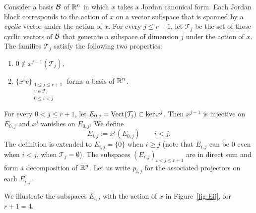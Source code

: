 \documentclass[english]{article}
\begin{document}
Consider a basis $\operatorname{{\mathcal{B}}}$ of $\mathbb{R}^n$ in which $x$ takes a Jordan canonical form. Each Jordan block corresponds to the action of $x$ on a vector subspace that is spanned by a \emph{cyclic} vector under the action of $x$. For every $j\leqslant r+1$, let $\mathcal{T}_j$ be the set of those cyclic vectors of $\operatorname{{\mathcal{B}}}$ that generate a subspace of dimension $j$ under the action of $x$.
The families $\mathcal{T}_j$ satisfy the following two properties:
\begin{enumerate}
    \item $0\notin x^{j-1}(\mathcal{T}_j)$,
    \item $\{
                x^i v
            \}_{
            \substack{
                1 \leqslant j \leqslant r+1
                \\
                v \in \mathcal{T}_i
                \\
                0\leqslant i < j}
                }$
            forms a basis of $\mathbb{R}^n$.
\end{enumerate}
%
%
For every $0< j \leqslant r+1$, let $E_{0,j} = \operatorname{Vect}(\mathcal{T}_j) \subset \ker x^{j}$.
Then $x^{j-1}$ is injective on $E_{0,j}$ and $x^j$ vanishes on $E_{0,j}$. We define
\begin{equation}\label{eqno:DefEij}
    E_{i,j} := x^i (E_{0,j})
    \qquad
    i<j
.\end{equation}
The definition is extended to $E_{i,j} = \{0\}$ when $i\geqslant j$ (note that $E_{i,j}$ can be $0$ even when $i<j$, when $\mathcal{T}_j = \emptyset$).
The subspaces $\left( E_{i,j} \right)_{i<j\leqslant r+1}$ are in direct sum and form a decomposition of $\mathbb{R}^n$. Let us write $p_{i,j}$ for the associated projectors on each $E_{i,j}$. 


We illustrate the subspaces $E_{i,j}$ with the action of $x$ in Figure~\ref{fig:Eij}, for $r+1=4$.
\end{document}
